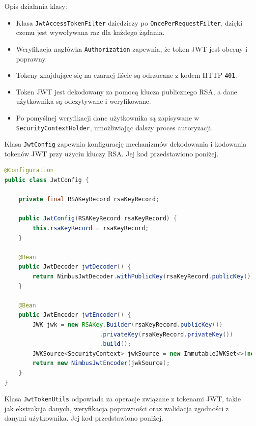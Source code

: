 \noindent Opis działania klasy:
\begin{itemize}
    \item Klasa \texttt{JwtAccessTokenFilter} dziedziczy po \texttt{OncePerRequestFilter}, dzięki czemu jest wywoływana raz dla każdego żądania.
    \item Weryfikacja nagłówka \texttt{Authorization} zapewnia, że token JWT jest obecny i poprawny.
    \item Tokeny znajdujące się na czarnej liście są odrzucane z kodem HTTP \texttt{401}.
    \item Token JWT jest dekodowany za pomocą klucza publicznego RSA, a dane użytkownika są odczytywane i weryfikowane.
    \item Po pomyślnej weryfikacji dane użytkownika są zapisywane w \texttt{SecurityContextHolder}, umożliwiając dalszy proces autoryzacji.
\end{itemize}


Klasa \texttt{JwtConfig} zapewnia konfigurację mechanizmów dekodowania i kodowania tokenów JWT przy użyciu kluczy RSA. Jej kod przedstawiono poniżej.
\begin{lstlisting}[language=Java, style=JavaStyle, caption=Klasa \texttt{JwtConfig}]
@Configuration
public class JwtConfig {

    private final RSAKeyRecord rsaKeyRecord;

    public JwtConfig(RSAKeyRecord rsaKeyRecord) {
        this.rsaKeyRecord = rsaKeyRecord;
    }

    @Bean
    public JwtDecoder jwtDecoder() {
        return NimbusJwtDecoder.withPublicKey(rsaKeyRecord.publicKey()).build();
    }

    @Bean
    public JwtEncoder jwtEncoder() {
        JWK jwk = new RSAKey.Builder(rsaKeyRecord.publicKey())
                           .privateKey(rsaKeyRecord.privateKey())
                           .build();
        JWKSource<SecurityContext> jwkSource = new ImmutableJWKSet<>(new JWKSet(jwk));
        return new NimbusJwtEncoder(jwkSource);
    }
}
\end{lstlisting}

Klasa \texttt{JwtTokenUtils} odpowiada za operacje związane z tokenami JWT, takie jak ekstrakcja danych, weryfikacja poprawności oraz walidacja zgodności z danymi użytkownika. Jej kod przedstawiono poniżej.

